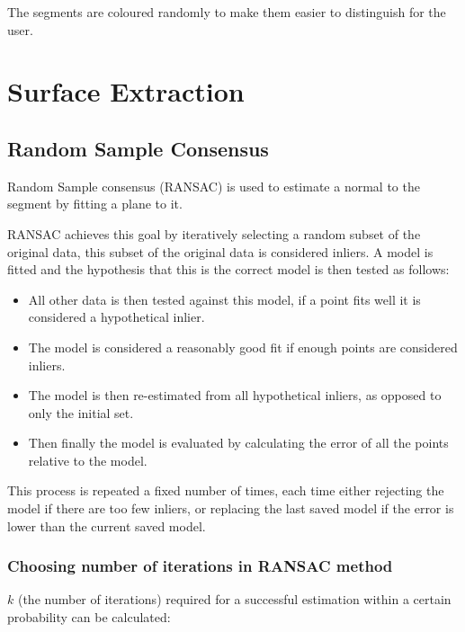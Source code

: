 		The segments are coloured randomly to make them easier to distinguish for the user.
		
		
	
\section{Surface Extraction}
	
		\subsection{Random Sample Consensus}
		\label{RANSAC expl}
			Random Sample consensus (RANSAC) is used to estimate a normal to the segment by fitting a plane to it.
			
			RANSAC achieves this goal by iteratively selecting a random subset of the original data, this subset of the original data is considered inliers. A model is fitted and the hypothesis that this is the correct model is then tested as follows:
			
			\begin{itemize}
				\item All other data is then tested against this model, if a point fits well it is considered a hypothetical inlier.
				
				\item The model is considered a reasonably good fit if enough points are considered inliers.
				
				\item The model is then re-estimated from all hypothetical inliers, as opposed to only the initial set.
				
				\item Then finally the model is evaluated by calculating the error of all the points relative to the model.
			\end{itemize}
			
			This process is repeated a fixed number of times, each time either rejecting the model if there are too few inliers, or replacing the last saved model if the error is lower than the current saved model.
			
			
			\subsubsection{Choosing number of iterations in RANSAC method}
				$k$ (the number of iterations) required for a successful estimation within a certain probability can be calculated:
				
